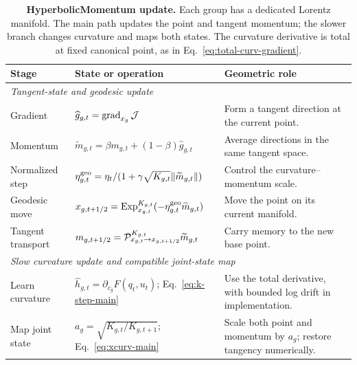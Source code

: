 \begin{table}[t]
\centering
\caption{\textbf{HyperbolicMomentum update.} Each group has a dedicated Lorentz manifold. The main path updates the point and tangent momentum; the slower branch changes curvature and maps both states. The curvature derivative is total at fixed canonical point, as in Eq.~\eqref{eq:total-curv-gradient}.}
\label{tab:method-overview}
\footnotesize\setlength{\tabcolsep}{4.2pt}\renewcommand{\arraystretch}{1.12}
\begin{tabularx}{\linewidth}{l l X}
\toprule
Stage & State or operation & Geometric role \\
\midrule
\multicolumn{3}{l}{\textit{Tangent-state and geodesic update}} \\
Gradient & $\widehat g_{g,t}=\operatorname{grad}_{x_g}\mathcal J$ & Form a tangent direction at the current point. \\
Momentum & $\widetilde m_{g,t}=\beta m_{g,t}+(1-\beta)\widehat g_{g,t}$ & Average directions in the same tangent space. \\
\rowcolor{oursbg}
Normalized step & $\eta^{\rm geo}_{g,t}=\eta_t/(1+\gamma\sqrt{K_{g,t}}\|\widetilde m_{g,t}\|)$ & Control the curvature--momentum scale. \\
Geodesic move & $x_{g,t+1/2}=\operatorname{Exp}_{x_{g,t}}^{K_{g,t}}(-\eta^{\rm geo}_{g,t}\widetilde m_{g,t})$ & Move the point on its current manifold. \\
Tangent transport & $m_{g,t+1/2}=\mathcal{P}_{x_{g,t}\to x_{g,t+1/2}}^{K_{g,t}}\widetilde m_{g,t}$ & Carry memory to the new base point. \\
\midrule
\multicolumn{3}{l}{\textit{Slow curvature update and compatible joint-state map}} \\
\rowcolor{oursbg}
Learn curvature & $\widehat h_{g,t}=\partial_{c_g}F(q_t,u_t)$; Eq.~\eqref{eq:k-step-main} & Use the total derivative, with bounded log drift in implementation. \\
\rowcolor{oursbg}
Map joint state & $a_g=\sqrt{K_{g,t}/K_{g,t+1}}$; Eq.~\eqref{eq:xcurv-main} & Scale both point and momentum by $a_g$; restore tangency numerically. \\
\bottomrule
\end{tabularx}
\end{table}
